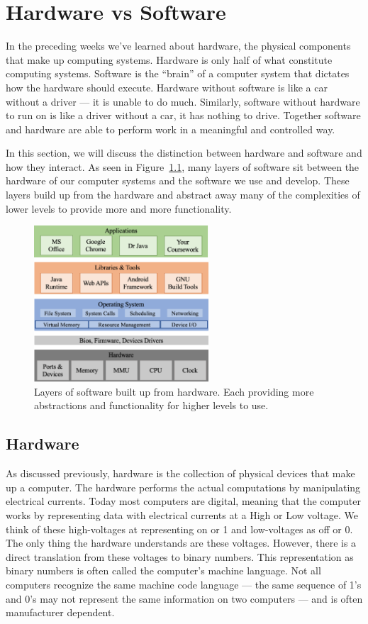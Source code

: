 \chapter{Hardware vs Software}

In the preceding weeks we've learned about hardware, the physical components that make up computing
systems. Hardware is only half of what constitute computing systems. Software is the ``brain'' of
a computer system that dictates how the hardware should execute. Hardware without software is like
a car without a driver --- it is unable to do much. Similarly, software without hardware to run on
is like a driver without a car, it has nothing to drive. Together software and hardware are able to
perform work in a meaningful and controlled way.

In this section, we will discuss the distinction between hardware and software and how they
interact. As seen in Figure~\ref{fig:hw_sw:layers}, many layers of software sit between the hardware of
our computer systems and the software we use and develop. These layers build up from the hardware and
abstract away many of the complexities of lower levels to provide more and more functionality.

\begin{figure}
\centering
\includegraphics[width=6.5cm]{images/software_layers.png}
\caption{Layers of software built up from hardware. Each providing more abstractions and functionality for higher levels to use.}
\label{fig:hw_sw:layers}
\end{figure}

\section{Hardware}
As discussed previously, hardware is the collection of physical devices that make up a computer.
The hardware performs the actual computations by manipulating electrical currents. Today most
computers are digital, meaning that the computer works by representing data with electrical currents
at a High or Low voltage. We think of these high-voltages at representing on or 1 and low-voltages
as off or 0. The only thing the hardware understands are these voltages. However, there is a direct
translation from these voltages to binary numbers. This representation as binary numbers is often
called the computer's machine language. Not all computers recognize the same machine code language ---
the same sequence of 1's and 0's may not represent the same information on two computers ---
and is often manufacturer dependent.

